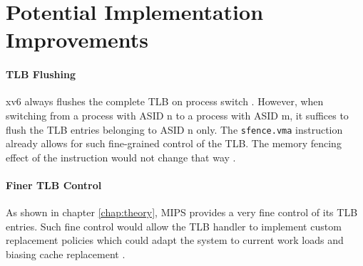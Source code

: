 \section{Potential Implementation Improvements}

\paragraph{TLB Flushing} xv6 always flushes the complete TLB on process switch \cite{cox2011xv6}. However, when switching from a process with ASID n to a process with ASID m, it suffices to flush the TLB entries belonging to ASID n only. The \texttt{sfence.vma} instruction already allows for such fine-grained control of the TLB. The memory fencing effect of the instruction would not change that way \cite{RISCVInstructionSet}.

\paragraph{Finer TLB Control} As shown in chapter \ref{chap:theory}, MIPS \cite{MIPSArchitectureProgrammers2016} provides a very fine control of its TLB entries. Such fine control would allow the TLB handler to implement custom replacement policies which could adapt the system to current work loads and biasing cache replacement \cite{park2022every}.


%





%







